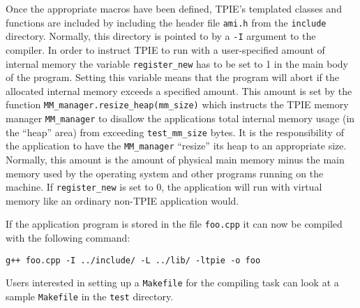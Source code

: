 Once the appropriate macros have been defined, TPIE's templated classes and
functions are included by including the header file \verb|ami.h| from the
\verb|include| directory. Normally, this directory is pointed to by a
\verb|-I| argument to the compiler. In order to instruct TPIE to run with a
user-specified amount of internal memory the variable \verb|register_new|
has to be set to 1 in the main body of the program. Setting this variable
means that the program will abort if the allocated internal memory exceeds
a specified amount.
This amount is set by the function \verb|MM_manager.resize_heap(mm_size)|
which instructs the TPIE memory manager \verb|MM_manager| to disallow the
applications total internal memory usage (in the ``heap'' area) from
exceeding \verb|test_mm_size| bytes. It is the responsibility of the
application to have the \verb|MM_manager| ``resize'' its heap to an
appropriate size. Normally, this amount is the amount of physical main
memory minus the main memory used by the operating system and other
programs running on the machine. If \verb|register_new| is set to 0, the
application will run with virtual memory like an ordinary non-TPIE
application would.

If the application program is stored in the file \verb|foo.cpp| it can now be
compiled with the following command:

\begin{verbatim}
g++ foo.cpp -I ../include/ -L ../lib/ -ltpie -o foo
\end{verbatim}

Users interested in setting up a \verb|Makefile| for the compiling task can
look at a sample \verb|Makefile| in the \verb|test| directory.



